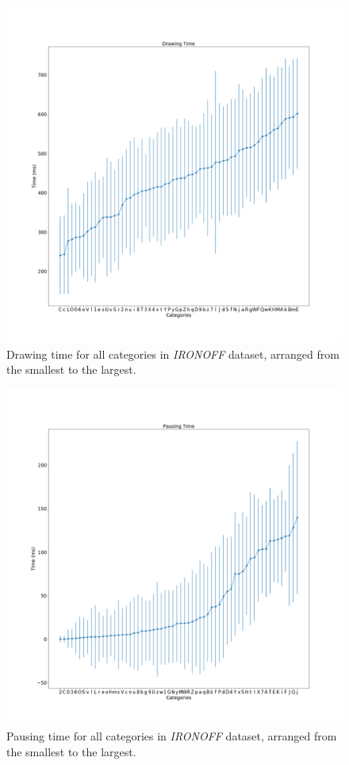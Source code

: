 \begin{figure}
    \centering
    \includegraphics[scale=0.4]{images/dataset/drawing_time.png}
    \caption{Drawing time for all categories in \textit{IRONOFF} dataset, arranged from the smallest to the largest.}
    \label{fig:ironoff_drawingtime}
\end{figure}

\begin{figure}
    \centering
    \includegraphics[scale=0.4]{images/dataset/pausing_time.png}
    \caption{Pausing time for all categories in \textit{IRONOFF} dataset, arranged from the smallest to the largest.}
    \label{fig:ironoff_pausingtime}
\end{figure}

